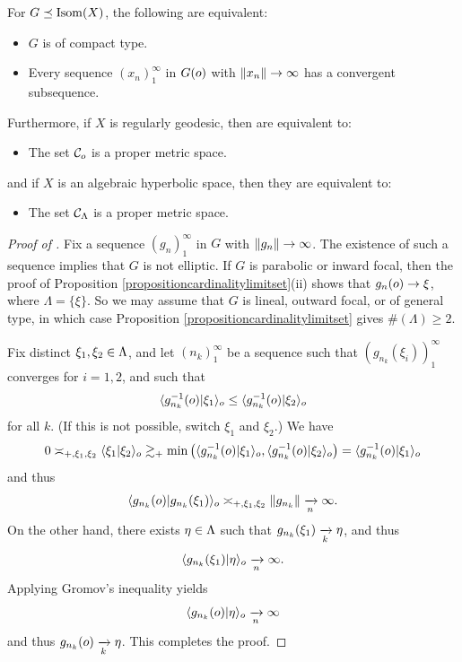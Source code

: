 \begin{proposition}
\label{propositioncompacttype}
For $G\preceq\operatorname{Isom}(X)$, the following are equivalent:
\begin{itemize}
\item[(A)] $G$ is of compact type.
\item[(B)] Every sequence $(x_n)_1^\infty$ in $G(o)$ with $\|x_n\|\to \infty$ has a convergent subsequence.
\end{itemize}
Furthermore, if $X$ is regularly geodesic, then  are equivalent to:
\begin{itemize}
\item[(C)] The set $\mathcal C_o$ is a proper metric space.
\end{itemize}
and if $X$ is an algebraic hyperbolic space, then they are equivalent to:
\begin{itemize}
\item[(D)] The set $\mathcal C_\Lambda$ is a proper metric space.
\end{itemize}
\end{proposition}
\begin{proof}[Proof of  \implies {}]
Fix a sequence $(g_n)_1^\infty$ in $G$ with $\|g_n\|\to \infty$. The existence of such a sequence implies that $G$ is not elliptic. If $G$ is parabolic or inward focal, then the proof of Proposition \ref{propositioncardinalitylimitset}(ii) shows that $g_n(o)\to \xi$, where $\Lambda = \{\xi\}$. So we may assume that $G$ is lineal, outward focal, or of general type, in which case Proposition \ref{propositioncardinalitylimitset} gives $\#(\Lambda)\geq 2$.

Fix distinct $\xi_1,\xi_2\in\Lambda$, and let $(n_k)_1^\infty$ be a sequence such that $(g_{n_k}(\xi_i))_1^\infty$ converges for $i = 1,2$, and such that
\[
\langle g_{n_k}^{-1}(o)|\xi_1\rangle_o \leq \langle g_{n_k}^{-1}(o)|\xi_2\rangle_o
\]
for all $k$. (If this is not possible, switch $\xi_1$ and $\xi_2$.) We have
\[
0 \asymp_{+,\xi_1,\xi_2} \langle \xi_1|\xi_2\rangle_o
\gtrsim_+ \min\left(\langle g_{n_k}^{-1}(o)|\xi_1\rangle_o,\langle g_{n_k}^{-1}(o)|\xi_2\rangle_o\right)
= \langle g_{n_k}^{-1}(o)|\xi_1\rangle_o
\]
and thus
\[
\langle g_{n_k}(o)|g_{n_k}(\xi_1)\rangle_o \asymp_{+,\xi_1,\xi_2} \|g_{n_k}\| \xrightarrow[n]{} \infty.
\]
On the other hand, there exists $\eta\in\Lambda$ such that $g_{n_k}(\xi_1)\xrightarrow[k]{}\eta$, and thus
\[
\langle g_{n_k}(\xi_1)|\eta\rangle_o\xrightarrow[n]{} \infty.
\]
Applying Gromov's inequality yields
\[
\langle g_{n_k}(o)|\eta\rangle_o \xrightarrow[n]{} \infty
\]
and thus $g_{n_k}(o)\xrightarrow[k]{}\eta$. This completes the proof.
\end{proof}
